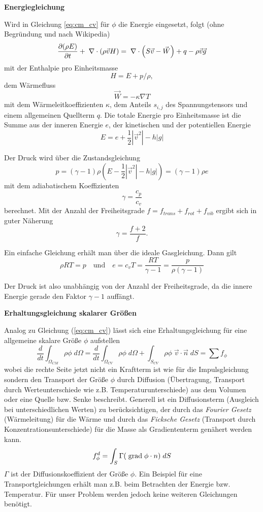 {\bf Energiegleichung}

Wird in Gleichung \ref{eq:cm_cv} für $\phi$ die Energie eingesetzt,
folgt (ohne Begründung und nach Wikipedia)
\begin{equation}
\frac{\partial (\rho E)}{\partial t} + \;\nabla \cdot (\rho \vec{v} H) = 
\;\nabla \cdot \left(S \vec{v} - \vec{W} \right) + q - \rho
\vec{v}\vec{g} \label{eq:transport_E}
\end{equation}
mit der Enthalpie pro Einheitsmasse 
\[
H = E+p/\rho,
\] dem Wärmefluss
\[
\vec{W} = - \kappa \nabla T
\]
mit dem Wärmeleitkoeffizienten $\kappa$, dem Anteils $s_{i,j}$ des
Spannungstensors und einem allgemeinen Quellterm $q$. Die totale
Energie pro Einheitsmasse ist die Summe aus der inneren Energie $e$,
der kinetischen und der potentiellen Energie
\[
E = e + \frac{1}{2} |\vec{v}^2| - h |g|
\]

Der Druck wird über die Zustandsgleichung
\[
p = (\gamma-1) \rho \left(E -  \frac{1}{2} |\vec{v}^2|  - h |g|\right)
  = (\gamma-1) \rho e
\]
mit dem adiabatischem Koeffizienten 
\[
\gamma = \frac{c_p}{c_v}
\]
berechnet. Mit der Anzahl der Freiheitsgrade $f = f_{trans} + f_{rot}
+ f_{vib}$ ergibt sich in guter Näherung
\[
\gamma = \frac{f+2}{f}.
\]

Ein einfache Gleichung erhält man über die ideale Gasgleichung. Dann gilt
\[
\rho R T = p \quad \mbox{und} \quad e = c_v T = \frac{RT}{\gamma-1} =
\frac{p}{\rho (\gamma-1)}
\]

Der Druck ist also unabhängig von der Anzahl der Freiheitsgrade, da
die innere Energie gerade den Faktor $\gamma-1$ auffängt.


{\bf Erhaltungsgleichung skalarer Größen}

Analog zu Gleichung (\ref{eq:cm_cv}) lässt sich eine Erhaltungsgleichung für
eine allgemeine skalare Größe $\phi$ aufstellen
\begin{equation}
\frac{d}{dt} \int_{\Omega_{CM}} \rho \phi \; d \Omega = \frac{d}{dt}
\int_{\Omega_{CV}} \rho \phi \; d \Omega + \int_{S_{CV}} \rho \phi \;
\vec{v}\cdot \vec{n} \; d S  = \sum f_\phi
\end{equation} 
wobei die rechte Seite jetzt nicht ein Kraftterm ist wie für die
Impulsgleichung sondern den Transport der Größe $\phi$ durch Diffusion
(Übertragung, Transport durch Werteunterschiede wie z.B.
Temperaturunterschiede) aus dem Volumen oder eine Quelle bzw. Senke
beschreibt. Generell ist ein Diffusionsterm (Ausgleich bei unterschiedlichen
Werten) zu berücksichtigen, der durch das {\it Fourier Gesetz} (Wärmeleitung)
für die Wärme und durch das {\it Ficksche Gesetz} (Transport durch
Konzentrationsunterschiede) für die Masse als Gradiententerm genähert werden
kann.
\begin{equation}
f_\phi^d = \int_S \Gamma (\;\mbox{grad}\; \phi \cdot n)  \; d S
\end{equation} 
$\Gamma$ ist der Diffusionskoeffizient der Größe $\phi$. Ein Beispiel für eine
Transportgleichungen erhält man z.B. beim Betrachten der Energie bzw.
Temperatur. Für unser Problem werden jedoch keine weiteren Gleichungen
benötigt.

